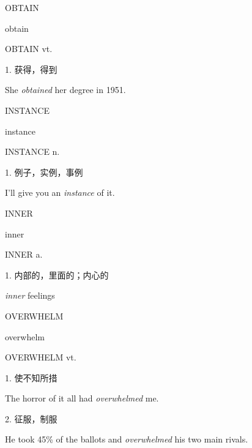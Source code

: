 \begin{flashcard}{
OBTAIN

obtain
}
\begin{center}
OBTAIN vt. 
\end{center}
1. 获得，得到

She \textit{obtained} her degree in 1951.

\end{flashcard}
\begin{flashcard}{
INSTANCE

instance
}
\begin{center}
INSTANCE n. 
\end{center}
1. 例子，实例，事例

I'll give you an \textit{instance} of it.

\end{flashcard}
\begin{flashcard}{
INNER

inner
}
\begin{center}
INNER a. 
\end{center}
1. 内部的，里面的；内心的

\textit{inner} feelings

\end{flashcard}
\begin{flashcard}{
OVERWHELM

overwhelm
}
\begin{center}
OVERWHELM vt. 
\end{center}
1. 使不知所措

The horror of it all had \textit{overwhelmed} me.

2. 征服，制服

He took 45\% of the ballots and \textit{overwhelmed} his two main rivals.

\end{flashcard}
